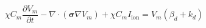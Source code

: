 $$
\chi C_m\frac{\partial V_m}{\partial t} - \nabla\!\cdot\!\left(\boldsymbol\sigma\nabla V_m\right) + \chi C_m I_{\mathrm{ion}} = V_m \left(\beta_d + k_d\right)
$$
